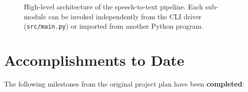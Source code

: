 \documentclass[conference]{IEEEtran}
\begin{document}
\begin{figure}[!t]
  \centering
  \caption{High-level architecture of the speech-to-text pipeline.  Each
           sub-module can be invoked independently from the CLI driver
           (\texttt{src/main.py}) or imported from another Python program.}
  \label{fig:arch}
\end{figure}

\section{Accomplishments to Date}\label{sec:accomplishments}
The following milestones from the original project plan have been
\textbf{completed}:
\end{document}
